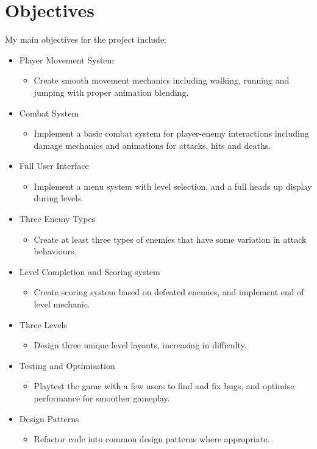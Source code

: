 \documentclass[]{final_report}
\begin{document}
\section{Objectives}
My main objectives for the project include:
\begin{itemize}
    \item Player Movement System
    \begin{itemize}
	\item{Create smooth movement mechanics including walking, running and jumping with proper animation blending.}
    \end{itemize}
    \item Combat System
    \begin{itemize}
	\item{Implement a basic combat system for player-enemy interactions including damage mechanics and animations for attacks, hits and deaths.}
    \end{itemize}
    \item Full User Interface
    \begin{itemize}
	\item{Implement a menu system with level selection, and a full heads up display during levels.}
    \end{itemize}
    \item Three Enemy Types
    \begin{itemize}
	\item{Create at least three types of enemies that have some variation in attack behaviours.}
    \end{itemize}
    \item Level Completion and Scoring system
    \begin{itemize}
	\item{Create scoring system based on defeated enemies, and implement end of level mechanic.}
    \end{itemize}
    \item Three Levels
    \begin{itemize}
	\item{Design three unique level layouts, increasing in difficulty.}
    \end{itemize}
    \item Testing and Optimisation
    \begin{itemize}
	\item{Playtest the game with a few users to find and fix bugs, and optimise performance for smoother gameplay.}
    \end{itemize}
    \item Design Patterns
    \begin{itemize}
	\item{Refactor code into common design patterns where appropriate.}
    \end{itemize}
\end{itemize}
\end{document}

